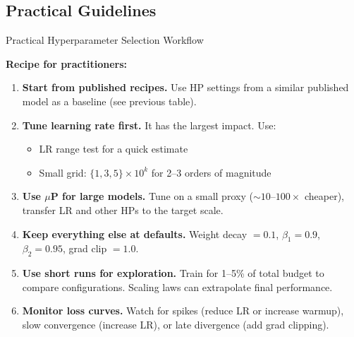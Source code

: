 \subsection{Practical Guidelines}

\begin{frame}{Practical Hyperparameter Selection Workflow}

  \textbf{Recipe for practitioners:}

  \vspace{0.4em}
  \begin{enumerate}
    \item \textbf{Start from published recipes.} Use HP settings from a similar published model as a baseline (see previous table).

    \item \textbf{Tune learning rate first.} It has the largest impact. Use:
      \begin{itemize}
        \item LR range test for a quick estimate
        \item Small grid: $\{1, 3, 5\} \times 10^{k}$ for 2--3 orders of magnitude
      \end{itemize}

    \item \textbf{Use $\mu$P for large models.} Tune on a small proxy ($\sim$$10\text{--}100\times$ cheaper), transfer LR and other HPs to the target scale.

    \item \textbf{Keep everything else at defaults.} Weight decay $= 0.1$, $\beta_1 = 0.9$, $\beta_2 = 0.95$, grad clip $= 1.0$.

    \item \textbf{Use short runs for exploration.} Train for 1--5\% of total budget to compare configurations. Scaling laws can extrapolate final performance.

    \item \textbf{Monitor loss curves.} Watch for spikes (reduce LR or increase warmup), slow convergence (increase LR), or late divergence (add grad clipping).
  \end{enumerate}
\end{frame}


